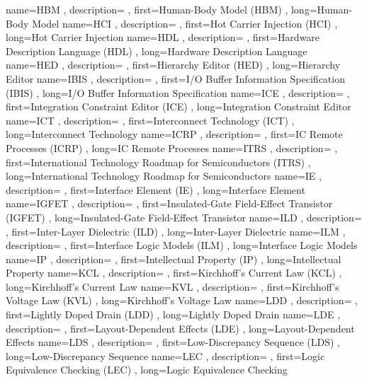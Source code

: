 { name={HBM}
, description={}
, first={Human-Body Model (HBM)}
, long={Human-Body Model}
}
{ name={HCI}
, description={}
, first={Hot Carrier Injection (HCI)}
, long={Hot Carrier Injection}
}
{ name={HDL}
, description={}
, first={Hardware Description Language (HDL)}
, long={Hardware Description Language}
}
{ name={HED}
, description={}
, first={Hierarchy Editor (HED)}
, long={Hierarchy Editor}
}
{ name={IBIS}
, description={}
, first={I/O Buffer Information Specification (IBIS)}
, long={I/O Buffer Information Specification}
}
{ name={ICE}
, description={}
, first={Integration Constraint Editor (ICE)}
, long={Integration Constraint Editor}
}
{ name={ICT}
, description={}
, first={Interconnect Technology (ICT)}
, long={Interconnect Technology}
}
{ name={ICRP}
, description={}
, first={IC Remote Processes (ICRP)}
, long={IC Remote Processes}
}
{ name={ITRS}
, description={}
, first={International Technology Roadmap for Semiconductors (ITRS)}
, long={International Technology Roadmap for Semiconductors}
}
{ name={IE}
, description={}
, first={Interface Element (IE)}
, long={Interface Element}
}
{ name={IGFET}
, description={}
, first={Insulated-Gate Field-Effect Transistor (IGFET)}
, long={Insulated-Gate Field-Effect Transistor}
}
{ name={ILD}
, description={}
, first={Inter-Layer Dielectric (ILD)}
, long={Inter-Layer Dielectric}
}
{ name={ILM}
, description={}
, first={Interface Logic Models (ILM)}
, long={Interface Logic Models}
}
{ name={IP}
, description={}
, first={Intellectual Property (IP)}
, long={Intellectual Property}
}
{ name={KCL}
, description={}
, first={Kirchhoff’s Current Law (KCL)}
, long={Kirchhoff’s Current Law}
}
{ name={KVL}
, description={}
, first={Kirchhoff’s Voltage Law (KVL)}
, long={Kirchhoff’s Voltage Law}
}
{ name={LDD}
, description={}
, first={Lightly Doped Drain (LDD)}
, long={Lightly Doped Drain}
}
{ name={LDE}
, description={}
, first={Layout-Dependent Effects (LDE)}
, long={Layout-Dependent Effects}
}
{ name={LDS}
, description={}
, first={Low-Discrepancy Sequence (LDS)}
, long={Low-Discrepancy Sequence}
}
{ name={LEC}
, description={}
, first={Logic Equivalence Checking (LEC)}
, long={Logic Equivalence Checking}
}
